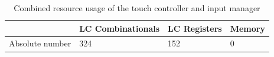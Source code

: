 \documentclass[11pt,a4paper,titlepage,oneside]{article}
\begin{document}

\begin{table}[h!]
	\centering
	\begin{tabular}{|l|l|l|l|}
	\hline
	& LC Combinationals & LC Registers & Memory      \\ \hline 
	Absolute number      &        324           &     152         &      0       \\ \hline
	\end{tabular}
	\caption{Combined resource usage of the touch controller and input manager }
\end{table}

\end{document}
